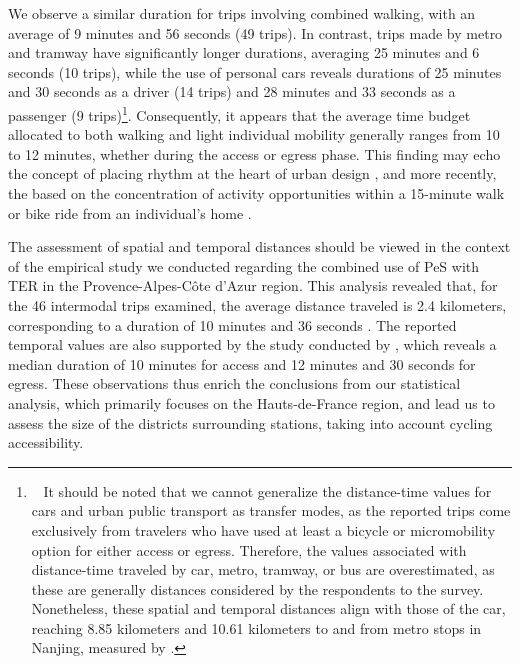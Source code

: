 \begin{refsegment}
We observe a similar duration for trips involving combined walking, with an average of 9 minutes and 56 seconds (49 trips). In contrast, trips made by metro and tramway have significantly longer durations, averaging 25 minutes and 6 seconds (10 trips), while the use of personal cars reveals durations of 25 minutes and 30 seconds as a driver (14 trips) and 28 minutes and 33 seconds as a passenger (9 trips)\footnote{~
    It should be noted that we cannot generalize the distance-time values for cars and urban public transport as transfer modes, as the reported trips come exclusively from travelers who have used at least a bicycle or micromobility option for either access or egress. Therefore, the values associated with distance-time traveled by car, metro, tramway, or bus are overestimated, as these are generally distances considered  by the respondents to the survey. Nonetheless, these spatial and temporal distances align with those of the car, reaching 8.85 kilometers and 10.61 kilometers to and from metro stops in Nanjing, measured by \textcolor{blue}{\textcite[9]{li_measuring_2022}}.
}. Consequently, it appears that the average time budget allocated to both walking and light individual mobility generally ranges from 10 to 12 minutes, whether during the access or egress phase. This finding may echo the concept of  placing rhythm at the heart of urban design \textcolor{blue}{\autocite[120]{ascher_du_1997}}, and more recently, the  based on the concentration of activity opportunities within a 15-minute walk or bike ride from an individual's home \textcolor{blue}{\autocite[126]{moreno_droit_2020}}.%

The assessment of spatial and temporal distances should be viewed in the context of the empirical study we conducted regarding the combined use of \acrshort{PeS} with \acrshort{TER} in the Provence-Alpes-Côte d'Azur region. This analysis revealed that, for the 46 intermodal trips examined, the average distance traveled is 2.4 kilometers, corresponding to a duration of 10 minutes and 36 seconds \textcolor{blue}{\autocite[186]{moinse_intermodal_2022}}. The reported temporal values are also supported by the study conducted by \textcolor{blue}{\textcite[268]{krygsman_multimodal_2004}}, which reveals a median duration of 10 minutes for access and 12 minutes and 30 seconds for egress. These observations thus enrich the conclusions from our statistical analysis, which primarily focuses on the Hauts-de-France region, and lead us to assess the size of the districts surrounding stations, taking into account cycling accessibility.%


\end{refsegment}
